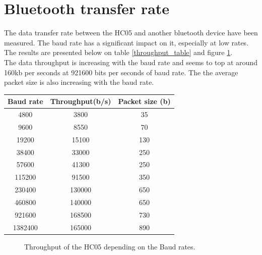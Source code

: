 \documentclass[11pt]{article}
\begin{document}
\section{Bluetooth transfer rate}
The data transfer rate between the HC05 and another bluetooth device have been measured. The baud rate has a significant impact on it, especially at low rates. The results are presented below on table \ref{throughput_table} and figure \ref{throughput_fig}.\\
The data throughput is increasing with the baud rate and seems to top at around 160kb per seconds at 921600 bits per seconds of baud rate. The the average packet size is also increasing with the baud rate.
\begin{center}
\label{throughput_table}
\begin{tabular}{|c|c|c|}
\hline
Baud rate & Throughput(b/s) & Packet size (b)\\
\hline
4800 & 3800 & 35 \\
\hline
9600 & 8550 & 70 \\
\hline
19200 & 15100 & 130 \\
\hline
38400 & 33000 & 250 \\
\hline
57600 & 41300 & 250 \\
\hline
115200 & 91500 & 350 \\
\hline
230400 & 130000 & 650 \\
\hline
460800 & 140000 & 650 \\
\hline
921600 & 168500 & 730 \\
\hline
1382400 & 165000 & 890\\
\hline
\end{tabular}
\end{center}
\begin{figure}[H]
\center
{}
\caption{Throughput of the HC05 depending on the Baud rates.}
\label{throughput_fig}
\end{figure}
\end{document}
